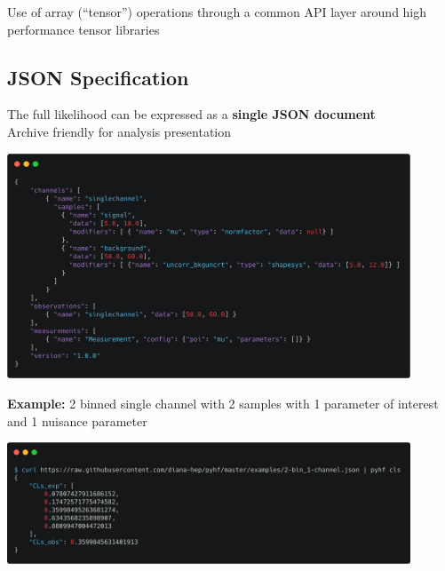 \documentclass[a0paper,fleqn]{betterposter}
\newcommand{\fontsizeinstitution}{\fontsize{16}{25} \selectfont}
\begin{document}
{ Use of array (``tensor'') operations through a common API layer around high performance tensor libraries

 \vspace{-1em}
 \subsection{JSON Specification}
 The full likelihood can be expressed as a \textbf{single JSON document}\\
 Archive friendly for analysis presentation
 \vspace{0.5em}
 \begin{center}
  \includegraphics[width=0.9\textwidth]{carbon_JSON_spec.png}
 \end{center}
 \vspace{-1em}
 \begin{center}
  {\fontsizeinstitution\textbf{Example:} 2 binned single channel with 2 samples with 1 parameter of interest and 1 nuisance parameter}
 \end{center}
 \begin{center}
  \includegraphics[width=0.9\textwidth]{carbon_pyhf_CLs.png}
 \end{center}

}
\end{document}
